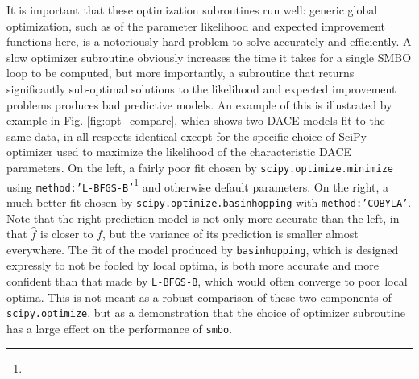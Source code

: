 It is important that these optimization subroutines run well: generic global optimization, such as of the parameter likelihood and expected improvement functions here, is a notoriously hard problem to solve accurately and efficiently. A slow optimizer subroutine obviously increases the time it takes for a single SMBO loop to be computed, but more importantly, a subroutine that returns significantly sub-optimal solutions to the likelihood and expected improvement problems produces bad predictive models. An example of this is illustrated by example in Fig. \ref{fig:opt_compare}, which shows two DACE models fit to the same data, in all respects identical except for the specific choice of SciPy optimizer used to maximize the likelihood of the characteristic DACE parameters. On the left, a fairly poor fit chosen by \texttt{scipy.optimize.minimize} using \texttt{method:'L-BFGS-B'}\footnote{} and otherwise default parameters. On the right, a much better fit chosen by \texttt{scipy.optimize.basinhopping} with \texttt{method:'COBYLA'}. Note that the right prediction model is not only more accurate than the left, in that $\hat{f}$ is closer to $f$, but the variance of its prediction is smaller almost everywhere. The fit of the model produced by \texttt{basinhopping}, which is designed expressly to not be fooled by local optima, is both more accurate and more confident than that made by \texttt{L-BFGS-B}, which would often converge to poor local optima. This is not meant as a robust comparison of these two components of \texttt{scipy.optimize}, but as a demonstration that the choice of optimizer subroutine has a large effect on the performance of \texttt{smbo}.
